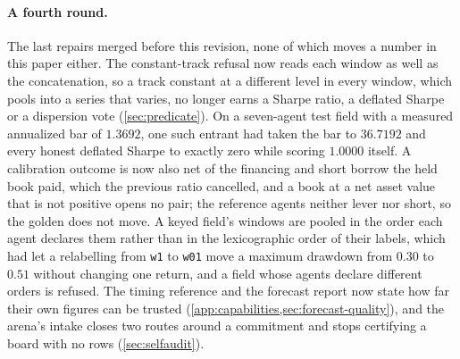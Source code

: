\paragraph{A fourth round.} The last repairs merged before this revision, none of which moves a number in this paper either. The constant-track refusal now reads each window as well as the concatenation, so a track constant at a different level in every window, which pools into a series that varies, no longer earns a Sharpe ratio, a deflated Sharpe or a dispersion vote (\cref{sec:predicate}). On a seven-agent test field with a measured annualized bar of $1.3692$, one such entrant had taken the bar to $36.7192$ and every honest deflated Sharpe to exactly zero while scoring $1.0000$ itself. A calibration outcome is now also net of the financing and short borrow the held book paid, which the previous ratio cancelled, and a book at a net asset value that is not positive opens no pair; the reference agents neither lever nor short, so the golden does not move. A keyed field's windows are pooled in the order each agent declares them rather than in the lexicographic order of their labels, which had let a relabelling from \texttt{w1} to \texttt{w01} move a maximum drawdown from $0.30$ to $0.51$ without changing one return, and a field whose agents declare different orders is refused. The timing reference and the forecast report now state how far their own figures can be trusted (\cref{app:capabilities,sec:forecast-quality}), and the arena's intake closes two routes around a commitment and stops certifying a board with no rows (\cref{sec:selfaudit}).
